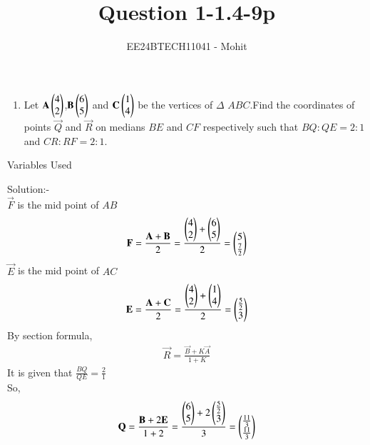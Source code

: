 \documentclass[journal]{IEEEtran}
\numberwithin{equation}{enumi}
\numberwithin{figure}{enumi}
\begin{document}

\title{Question 1-1.4-9p}
\author{EE24BTECH11041 - Mohit}
{\let\newpage\relax\maketitle}
\begin{enumerate}
	\item Let $\mathbf{A}\begin{pmatrix}4\\2\end{pmatrix}$,$\mathbf{B}\begin{pmatrix}6\\5\end{pmatrix}$ and $\mathbf{C}\begin{pmatrix}1\\4\end{pmatrix}$ be the vertices of $\Delta$ $ABC$.Find the coordinates of points $\vec{Q}$ and $\vec{R}$ on medians $BE$ and $CF$ respectively such that $BQ:QE=2:1$ and $CR:RF=2:1$.
\end{enumerate}
\begin{table}[h!]    
  \centering
  
  \caption{Variables Used}
  \label{tab 1.4.9.2}
\end{table}
Solution:-\\
$\vec{F}$ is the mid point of $AB$\\
\begin{align}
	\mathbf{F}=\frac{\mathbf{A}+\mathbf{B}}{2}=\frac{\begin{pmatrix}4\\2\end{pmatrix} + \begin{pmatrix}6\\5\end{pmatrix}}{2}
=\begin{pmatrix}5\\ \frac{7}{2}\end{pmatrix}
\end{align}
$\vec{E}$ is the mid point of $AC$\\
\begin{align}
	\mathbf{E}=\frac{\mathbf{A}+\mathbf{C}}{2}=\frac{\begin{pmatrix}4\\2\end{pmatrix} + \begin{pmatrix}1\\4\end{pmatrix}}{2}
=\begin{pmatrix}\frac{5}{2}\\3\end{pmatrix}
\end{align}
By section formula,
\begin{align}
	\vec{R}=\frac{\vec{B}+K\vec{A}}{1+K}
\end{align}
It is given that $\frac{BQ}{QE}=\frac{2}{1}$\\
So,\\
\begin{align}
	\mathbf{Q}=\frac{\mathbf{B}+2\mathbf{E}}{1+2}=\frac{\begin{pmatrix}6\\5\end{pmatrix} + 2\begin{pmatrix}\frac{5}{2}\\3\end{pmatrix}}{3}=\begin{pmatrix}\frac{11}{3}\\ \frac{11}{3}\end{pmatrix}
\end{align}
\end{document}

